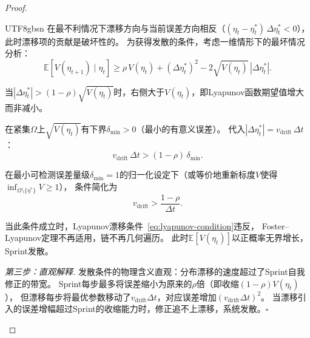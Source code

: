 \documentclass[12pt,a4paper]{article}
\newcommand{\E}{\mathbb{E}}
\begin{document}
\begin{proof}
\begin{CJK}{UTF8}{gbsn}
在最不利情况下漂移方向与当前误差方向相反（$(\eta_t - \eta^*_t)\,\Delta\eta^*_t < 0$），此时漂移项的贡献是破坏性的。
为获得发散的条件，考虑一维情形下的最坏情况分析：
\[
\E[V(\eta_{t+1}) \mid \eta_t] \ge \rho\,V(\eta_t) + (\Delta\eta^*_t)^2 - 2\sqrt{V(\eta_t)}\,|\Delta\eta^*_t|.
\]

当$|\Delta\eta^*_t| > (1-\rho)\sqrt{V(\eta_t)}$时，右侧大于$V(\eta_t)$，即Lyapunov函数期望值增大而非减小。

在紧集$\Omega$上$\sqrt{V(\eta_t)}$有下界$\delta_{\min} > 0$（最小的有意义误差）。
代入$|\Delta\eta^*_t| = v_{\text{drift}}\,\Delta t$：
\[
v_{\text{drift}}\,\Delta t > (1-\rho)\,\delta_{\min}.
\]

在最小可检测误差量级$\delta_{\min} = 1$的归一化设定下（或等价地重新标度$V$使得$\inf_{\Omega\setminus\{\eta^*\}} V \ge 1$），
条件简化为
\[
v_{\text{drift}} > \frac{1-\rho}{\Delta t}.
\]

当此条件成立时，Lyapunov漂移条件~\eqref{eq:lyapunov-condition}违反，
Foster--Lyapunov定理不再适用，链不再几何遍历。
此时$\E[V(\eta_t)]$以正概率无界增长，Sprint发散。

\emph{第三步：直观解释.}
发散条件的物理含义直观：分布漂移的速度超过了Sprint自我修正的带宽。
Sprint每步最多将误差缩小为原来的$\rho$倍（即收缩$(1-\rho)V(\eta_t)$），
但漂移每步将最优参数移动了$v_{\text{drift}}\Delta t$，对应误差增加$(v_{\text{drift}}\Delta t)^2$。
当漂移引入的误差增幅超过Sprint的收缩能力时，修正追不上漂移，系统发散。$\square$

\end{CJK}
\end{proof}
\end{document}
